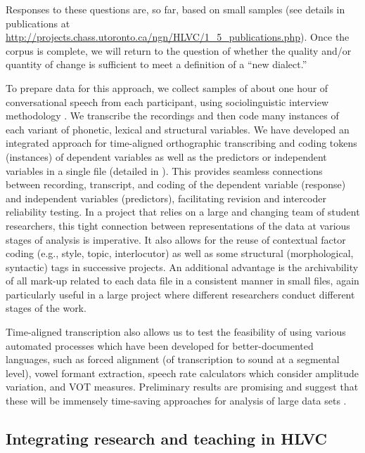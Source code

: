\documentclass[output=paper]{LSP/langsci}
\begin{document}
\largerpage[-1]
Responses to these questions are, so far, based on small samples (see details in publications at \url{http://projects.chass.utoronto.ca/ngn/HLVC/1\_5\_publications.php}). Once the corpus is complete, we will return to the question of whether the quality and/or quantity of change is sufficient to meet a definition of a “new dialect.”

To prepare data for this approach, we collect samples of about one hour of conversational speech from each participant, using sociolinguistic interview methodology \citep{labov_field_1984}. We transcribe the recordings and then code many instances of each variant of phonetic, lexical and structural variables. We have developed an integrated approach for time-aligned orthographic transcribing and coding tokens (instances) of dependent variables as well as the predictors or independent variables in a single file (detailed in \citealt{nagy_extending_2015}). This provides seamless connections between recording, transcript, and coding of the dependent variable (response) and independent variables (predictors), facilitating revision and intercoder reliability testing. In a project that relies on a large and changing team of student researchers, this tight connection between representations of the data at various stages of analysis is imperative. It also allows for the reuse of contextual factor coding (e.g., style, topic, interlocutor) as well as some structural (morphological, syntactic) tags in successive projects. An additional advantage is the archivability of all mark-up related to each data file in a consistent manner in small files, again particularly useful in a large project where different researchers conduct different stages of the work. 

Time-aligned transcription also allows us to test the feasibility of using various automated processes which have been developed for better-documented languages, such as forced alignment (of transcription to sound at a segmental level), vowel formant extraction, speech rate calculators which consider amplitude variation, and VOT measures. Preliminary results are promising and suggest that these will be immensely time-saving approaches for analysis of large data sets \citep{tse_exploring_2014}.

\subsection{Integrating research and teaching in HLVC}
\end{document}

